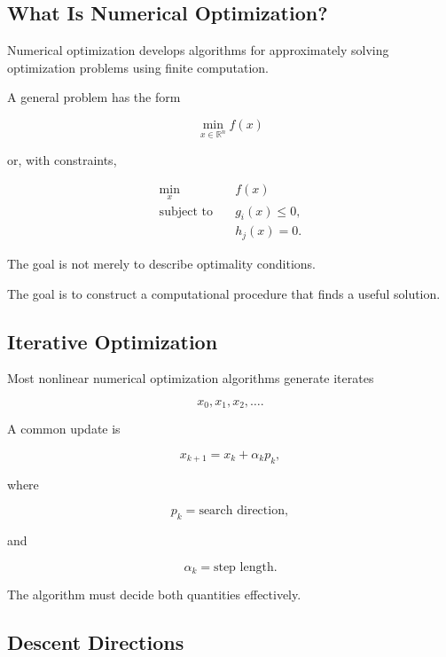 \subsection{What Is Numerical Optimization?}
\label{subsec:what-is-numerical-optimization}

Numerical optimization develops algorithms for approximately solving
optimization problems using finite computation.

A general problem has the form

\[
\boxed{
\min_{x\in\mathbb{R}^n}
f(x)
}
\]

or, with constraints,

\[
\boxed{
\begin{aligned}
\min_x
\quad&
f(x)
\\
\text{subject to}
\quad&
g_i(x)\leq0,
\\
&
h_j(x)=0.
\end{aligned}
}
\]

The goal is not merely to describe optimality conditions.

The goal is to construct a computational procedure that finds a useful
solution.

\subsection{Iterative Optimization}
\label{subsec:iterative-optimization}

Most nonlinear numerical optimization algorithms generate iterates

\[
\boxed{
x_0,x_1,x_2,\ldots.
}
\]

A common update is

\[
\boxed{
x_{k+1}
=
x_k
+
\alpha_kp_k,
}
\]

where

\[
p_k
=
\text{search direction},
\]

and

\[
\alpha_k
=
\text{step length}.
\]

The algorithm must decide both quantities effectively.

\subsection{Descent Directions}
\label{subsec:descent-directions}

